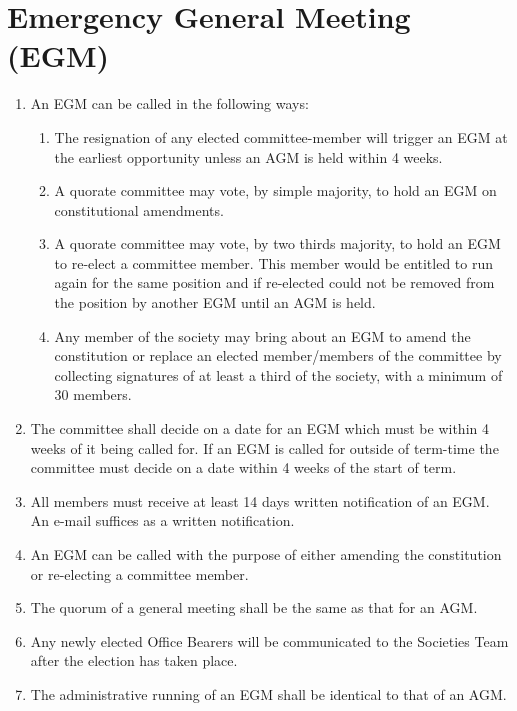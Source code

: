 \section{Emergency General Meeting (EGM)}

\begin{enumerate}
\item An EGM can be called in the following ways:
  \begin{enumerate}
  \item The resignation of any elected committee-member will trigger an EGM at the earliest opportunity unless an AGM is held within 4 weeks.
  \item A quorate committee may vote, by simple majority, to hold an EGM on constitutional amendments.
  \item A quorate committee may vote, by two thirds majority, to hold an EGM to re-elect a committee member. This member would be entitled to run again for the same position and if re-elected could not be removed from the position by another EGM until an AGM is held.
  \item Any member of the society may bring about an EGM to amend the constitution or replace an elected member/members of the committee by collecting signatures of at least a third of the society, with a minimum of 30 members.
  \end{enumerate}

\item The committee shall decide on a date for an EGM which must be within 4 weeks of it being called for. If an EGM is called for outside of term-time the committee must decide on a date within 4 weeks of the start of term.

\item All members must receive at least 14 days written notification of an EGM\@. An e-mail suffices as a written notification.

\item An EGM can be called with the purpose of either amending the constitution or re-electing a committee member.

\item The quorum of a general meeting shall be the same as that for an AGM\@.

\item Any newly elected Office Bearers will be communicated to the Societies Team after the election has taken place.

\item The administrative running of an EGM shall be identical to that of an AGM\@.

\end{enumerate}
